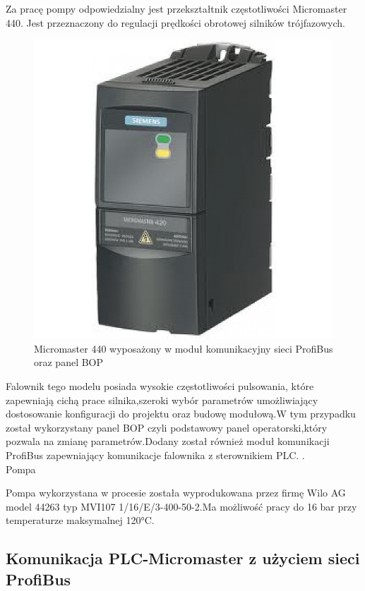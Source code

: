 Za pracę pompy odpowiedzialny jest przekształtnik częstotliwości Micromaster 440. Jest przeznaczony do
regulacji prędkości obrotowej silników trójfazowych. 
\begin{figure}[h]
\centering
\includegraphics[scale=0.3]{Zdjecia/Stanowiska/4_Pompa/Micromaster440.jpg}
\caption{Micromaster 440 wyposażony w moduł komunikacyjny sieci ProfiBus oraz panel BOP}
\end{figure}

Falownik tego modelu posiada wysokie częstotliwości pulsowania, które zapewniają cichą prace silnika,szeroki wybór parametrów umożliwiający dostosowanie konfiguracji do projektu oraz budowę modułową.W tym przypadku został wykorzystany panel BOP czyli podstawowy panel operatorski,który pozwala na zmianę parametrów.Dodany został również moduł komunikacji ProfiBus zapewniający komunikacje falownika z sterownikiem PLC.
\cite{diduce:MICROMASTER}.\\

\selectfont
Pompa
\selectfont 

Pompa wykorzystana w procesie została wyprodukowana przez firmę Wilo AG model 44263 typ MVI107 1/16/E/3-400-50-2.Ma możliwość pracy do 16 bar przy temperaturze maksymalnej 120°C.
\subsection{Komunikacja PLC-Micromaster z użyciem sieci ProfiBus}